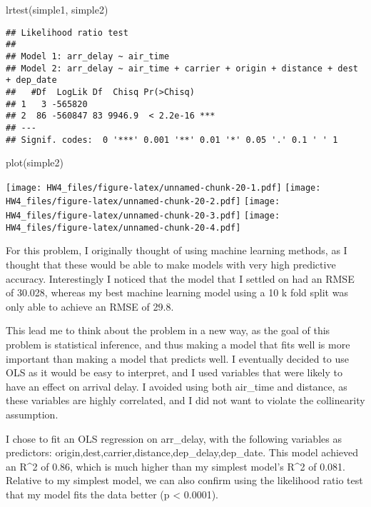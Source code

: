 \documentclass[
]{article}
\newenvironment{Shaded}{\begin{snugshade}}{\end{snugshade}}
\newcommand{\FunctionTok}[1]{\textcolor[rgb]{0.00,0.00,0.00}{#1}}
\newcommand{\NormalTok}[1]{#1}
\begin{document}
\begin{Shaded}
\begin{Highlighting}[]
\FunctionTok{lrtest}\NormalTok{(simple1, simple2)}
\end{Highlighting}
\end{Shaded}

\begin{verbatim}
## Likelihood ratio test
## 
## Model 1: arr_delay ~ air_time
## Model 2: arr_delay ~ air_time + carrier + origin + distance + dest + dep_date
##   #Df  LogLik Df  Chisq Pr(>Chisq)    
## 1   3 -565820                         
## 2  86 -560847 83 9946.9  < 2.2e-16 ***
## ---
## Signif. codes:  0 '***' 0.001 '**' 0.01 '*' 0.05 '.' 0.1 ' ' 1
\end{verbatim}

\begin{Shaded}
\begin{Highlighting}[]
\FunctionTok{plot}\NormalTok{(simple2)}
\end{Highlighting}
\end{Shaded}

\texttt{[image: HW4\_files/figure-latex/unnamed-chunk-20-1.pdf]}
\texttt{[image: HW4\_files/figure-latex/unnamed-chunk-20-2.pdf]}
\texttt{[image: HW4\_files/figure-latex/unnamed-chunk-20-3.pdf]}
\texttt{[image: HW4\_files/figure-latex/unnamed-chunk-20-4.pdf]}

For this problem, I originally thought of using machine learning
methods, as I thought that these would be able to make models with very
high predictive accuracy. Interestingly I noticed that the model that I
settled on had an RMSE of 30.028, whereas my best machine learning model
using a 10 k fold split was only able to achieve an RMSE of 29.8.

This lead me to think about the problem in a new way, as the goal of
this problem is statistical inference, and thus making a model that fits
well is more important than making a model that predicts well. I
eventually decided to use OLS as it would be easy to interpret, and I
used variables that were likely to have an effect on arrival delay. I
avoided using both air\_time and distance, as these variables are highly
correlated, and I did not want to violate the collinearity assumption.

I chose to fit an OLS regression on arr\_delay, with the following
variables as predictors:
origin,dest,carrier,distance,dep\_delay,dep\_date. This model achieved
an R\^{}2 of 0.86, which is much higher than my simplest model's R\^{}2
of 0.081. Relative to my simplest model, we can also confirm using the
likelihood ratio test that my model fits the data better (p \textless{}
0.0001).
\end{document}
